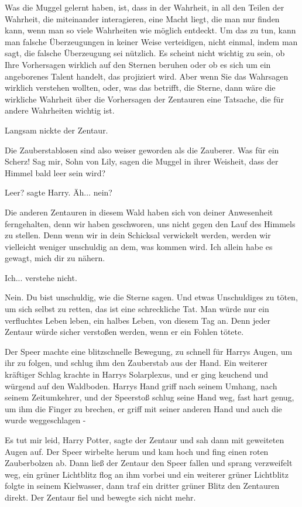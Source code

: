 \glqq{}Was die Muggel gelernt haben, ist, dass in der Wahrheit, in all den Teilen
der Wahrheit, die miteinander interagieren, eine Macht liegt, die man nur finden
kann, wenn man so viele Wahrheiten wie möglich entdeckt. Um das zu tun, kann man
falsche Überzeugungen in keiner Weise verteidigen, nicht einmal, indem man sagt,
die falsche Überzeugung sei nützlich. Es scheint nicht wichtig zu sein, ob Ihre
Vorhersagen wirklich auf den Sternen beruhen oder ob es sich um ein angeborenes
Talent handelt, das projiziert wird. Aber wenn Sie das Wahrsagen wirklich
verstehen wollten, oder, was das betrifft, die Sterne, dann wäre die wirkliche
Wahrheit über die Vorhersagen der Zentauren eine Tatsache, die für andere
Wahrheiten wichtig ist.\grqq{}

Langsam nickte der Zentaur.

\glqq{}Die Zauberstablosen sind also weiser geworden als die Zauberer. Was für
ein Scherz! Sag mir, Sohn von Lily, sagen die Muggel in ihrer Weisheit, dass der
Himmel bald leer sein wird?\grqq{}

\glqq{}Leer?\grqq{} sagte Harry. \glqq{}Äh... nein?\grqq{}

\glqq{}Die anderen Zentauren in diesem Wald haben sich von deiner Anwesenheit
ferngehalten, denn wir haben geschworen, uns nicht gegen den Lauf des Himmels zu
stellen. Denn wenn wir in dein Schicksal verwickelt werden, werden wir
vielleicht weniger unschuldig an dem, was kommen wird. Ich allein habe es
gewagt, mich dir zu nähern.\grqq{}

\glqq{}Ich... verstehe nicht.\grqq{}

\glqq{}Nein. Du bist unschuldig, wie die Sterne sagen. Und etwas Unschuldiges zu
töten, um sich selbst zu retten, das ist eine schreckliche Tat. Man würde nur
ein verfluchtes Leben leben, ein halbes Leben, von diesem Tag an. Denn jeder
Zentaur würde sicher verstoßen werden, wenn er ein Fohlen tötete.\grqq{}

Der Speer machte eine blitzschnelle Bewegung, zu schnell für Harrys Augen, um
ihr zu folgen, und schlug ihm den Zauberstab aus der Hand. Ein weiterer
kräftiger Schlag krachte in Harrys Solarplexus, und er ging keuchend und würgend
auf den Waldboden. Harrys Hand griff nach seinem Umhang, nach seinem
Zeitumkehrer, und der Speerstoß schlug seine Hand weg, fast hart genug, um ihm
die Finger zu brechen, er griff mit seiner anderen Hand und auch die wurde
weggeschlagen -

\glqq{}Es tut mir leid, Harry Potter\grqq{}, sagte der Zentaur und sah dann mit
geweiteten Augen auf. Der Speer wirbelte herum und kam hoch und fing einen roten
Zauberbolzen ab. Dann ließ der Zentaur den Speer fallen und sprang verzweifelt
weg, ein grüner Lichtblitz flog an ihm vorbei und ein weiterer grüner Lichtblitz
folgte in seinem Kielwasser, dann traf ein dritter grüner Blitz den Zentauren
direkt. Der Zentaur fiel und bewegte sich nicht mehr.

